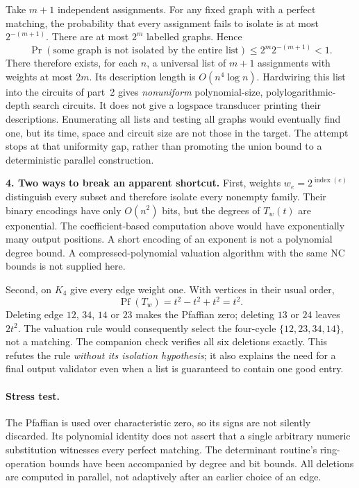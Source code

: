 \documentclass[11pt,a4paper]{article}
\numberwithin{equation}{section}
\begin{document}
Take $m+1$ independent assignments. For any fixed graph with a perfect
matching, the probability that every assignment fails to isolate is
at most $2^{-(m+1)}$. There are at most $2^m$ labelled graphs. Hence
\[
 \Pr(\text{some graph is not isolated by the entire list})
       \le2^m2^{-(m+1)}<1.
\]
There therefore exists, for each $n$, a universal list of $m+1$
assignments with weights at most $2m$. Its description length is
$O(n^4\log n)$. Hardwiring this list into the circuits of part~2 gives
\emph{nonuniform} polynomial-size, polylogarithmic-depth search circuits.
It does not give a logspace transducer printing their descriptions.
Enumerating all lists and testing all graphs would eventually find
one, but its time, space and circuit size are not those in the target.
The attempt stops at that uniformity gap, rather than promoting the
union bound to a deterministic parallel construction.

\textbf{4. Two ways to break an apparent shortcut.}
First, weights $w_e=2^{\operatorname{index}(e)}$ distinguish every
subset and therefore isolate every nonempty family. Their binary
encodings have only $O(n^2)$ bits, but the degrees of $T_w(t)$ are
exponential. The coefficient-based computation above would have
exponentially many output positions. A short encoding of an exponent
is not a polynomial degree bound. A compressed-polynomial valuation
algorithm with the same NC bounds is not supplied here.

Second, on $K_4$ give every edge weight one. With vertices in their
usual order,
\[
 \operatorname{Pf}(T_w)=t^2-t^2+t^2=t^2.
\]
Deleting edge $12$, $34$, $14$ or $23$ makes the Pfaffian zero; deleting
$13$ or $24$ leaves $2t^2$. The valuation rule would consequently
select the four-cycle $\{12,23,34,14\}$, not a matching. The companion
check verifies all six deletions exactly. This refutes the rule
\emph{without its isolation hypothesis}; it also explains the need for
a final output validator even when a list is guaranteed to contain one
good entry.

\paragraph{Stress test.}
The Pfaffian is used over characteristic zero, so its signs are not
silently discarded. Its polynomial identity does not assert that a
single arbitrary numeric substitution witnesses every perfect matching.
The determinant routine's ring-operation bounds have been accompanied
by degree and bit bounds. All deletions are computed in parallel, not
adaptively after an earlier choice of an edge.
\end{document}
